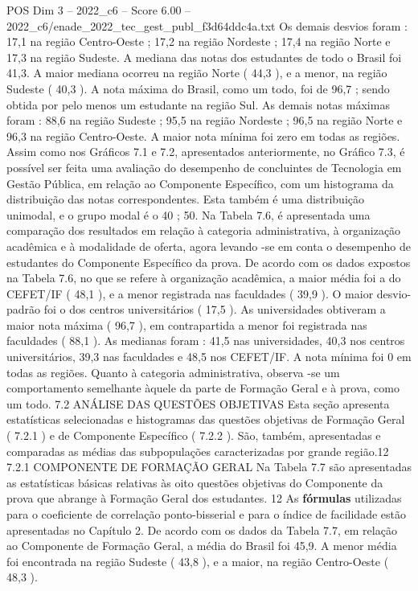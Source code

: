 \begin{textsample}{POS Dim 3 – 2022\_c6 – Score 6.00 – 2022\_c6/enade\_2022\_tec\_gest\_publ\_f3d64ddc4a.txt}
Os demais desvios foram : 17,1 na região Centro-Oeste ; 17,2 na região Nordeste ; 17,4 na região Norte e 17,3 na região Sudeste.
A mediana das notas dos estudantes de todo o Brasil foi 41,3.
A maior mediana ocorreu na região Norte ( 44,3 ), e a menor, na região Sudeste ( 40,3 ).
A nota máxima do Brasil, como um todo, foi de 96,7 ; sendo obtida por pelo menos um estudante na região Sul.
As demais notas máximas foram : 88,6 na região Sudeste ; 95,5 na região Nordeste ; 96,5 na região Norte e 96,3 na região Centro-Oeste.
A maior nota mínima foi zero em todas as regiões.
Assim como nos Gráficos 7.1 e 7.2, apresentados anteriormente, no Gráfico 7.3, é possível ser feita uma avaliação do desempenho de concluintes de Tecnologia em Gestão Pública, em relação ao Componente Específico, com um histograma da distribuição das notas correspondentes.
Esta também é uma distribuição unimodal, e o grupo modal é o 40 ; 50.
Na Tabela 7.6, é apresentada uma comparação dos resultados em relação à categoria administrativa, à organização acadêmica e à modalidade de oferta, agora levando -se em conta o desempenho de estudantes do Componente Específico da prova.
De acordo com os dados expostos na Tabela 7.6, no que se refere à organização acadêmica, a maior média foi a do CEFET/IF ( 48,1 ), e a menor registrada nas faculdades ( 39,9 ).
O maior desvio-padrão foi o dos centros universitários ( 17,5 ).
As universidades obtiveram a maior nota máxima ( 96,7 ), em contrapartida a menor foi registrada nas faculdades ( 88,1 ).
As medianas foram : 41,5 nas universidades, 40,3 nos centros universitários, 39,3 nas faculdades e 48,5 nos CEFET/IF.
A nota mínima foi 0 em todas as regiões.
Quanto à categoria administrativa, observa -se um comportamento semelhante àquele da parte de Formação Geral e à prova, como um todo. 7.2 ANÁLISE DAS QUESTÕES OBJETIVAS Esta seção apresenta estatísticas selecionadas e histogramas das questões objetivas de Formação Geral ( 7.2.1 ) e de Componente Específico ( 7.2.2 ).
São, também, apresentadas e comparadas as médias das subpopulações caracterizadas por grande região.12 7.2.1 COMPONENTE DE FORMAÇÃO GERAL Na Tabela 7.7 são apresentadas as estatísticas básicas relativas às oito questões objetivas do Componente da prova que abrange à Formação Geral dos estudantes. 12 As \textbf{fórmulas} utilizadas para o coeficiente de correlação ponto-bisserial e para o índice de facilidade estão apresentadas no Capítulo 2.
De acordo com os dados da Tabela 7.7, em relação ao Componente de Formação Geral, a média do Brasil foi 45,9.
A menor média foi encontrada na região Sudeste ( 43,8 ), e a maior, na região Centro-Oeste ( 48,3 ).

\end{textsample}
